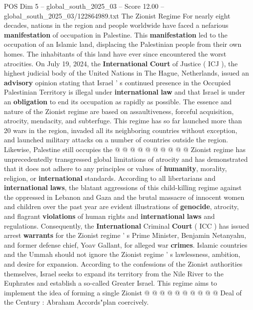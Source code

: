 \begin{textsample}{POS Dim 5 – global\_south\_2025\_03 – Score 12.00 – global\_south\_2025\_03/122864989.txt}  \label{ex:f5_pos_187}
The Zionist Regime For nearly eight decades, nations in the region and people worldwide have faced a nefarious \textbf{manifestation} of occupation in Palestine.
This \textbf{manifestation} led to the occupation of an Islamic land, displacing the Palestinian people from their own homes.
The inhabitants of this land have ever since encountered the worst atrocities.
On July 19, 2024, the \textbf{International} \textbf{Court} of Justice ( ICJ ), the highest judicial body of the United Nations in The Hague, Netherlands, issued an \textbf{advisory} opinion stating that Israel ' s continued presence in the Occupied Palestinian Territory is illegal under \textbf{international} \textbf{law} and that Israel is under an \textbf{obligation} to end its occupation as rapidly as possible.
The essence and nature of the Zionist regime are based on assaultiveness, forceful acquisition, atrocity, mendacity, and subterfuge.
This regime has so far launched more than 20 wars in the region, invaded all its neighboring countries without exception, and launched military attacks on a number of countries outside the region.
Likewise, Palestine still occupies the @ @ @ @ @ @ @ @ @ @ Zionist regime has unprecedentedly transgressed global limitations of atrocity and has demonstrated that it does not adhere to any principles or values of \textbf{humanity}, morality, religion, or \textbf{international} standards.
According to all libertarians and \textbf{international} \textbf{laws}, the blatant aggressions of this child-killing regime against the oppressed in Lebanon and Gaza and the brutal massacre of innocent women and children over the past year are evident illustrations of \textbf{genocide}, atrocity, and flagrant \textbf{violations} of human rights and \textbf{international} \textbf{laws} and regulations.
Consequently, the \textbf{International} Criminal \textbf{Court} ( ICC ) has issued arrest \textbf{warrants} for the Zionist regime ' s Prime Minister, Benjamin Netanyahu, and former defense chief, Yoav Gallant, for alleged war \textbf{crimes}.
Islamic countries and the Ummah should not ignore the Zionist regime ' s lawlessness, ambition, and desire for expansion.
According to the confessions of the Zionist authorities themselves, Israel seeks to expand its territory from the Nile River to the Euphrates and establish a so-called Greater Israel.
This regime aims to implement the idea of forming a single Zionist @ @ @ @ @ @ @ @ @ @ Deal of the Century : Abraham Accords"plan coercively.

\end{textsample}
